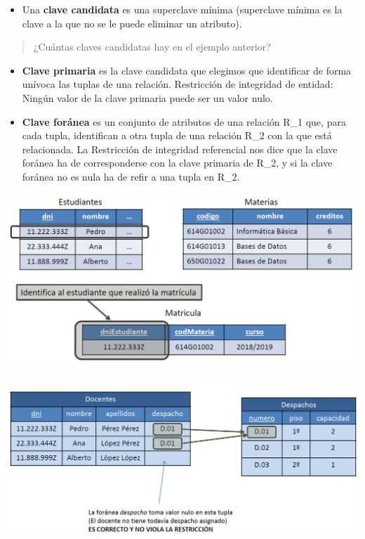 \documentclass[]{book}
\providecommand{\tightlist}{%
  \setlength{\itemsep}{0pt}\setlength{\parskip}{0pt}}
\begin{document}
\begin{itemize}
\tightlist
\item
  Una \textbf{clave candidata} es una superclave mínima (superclave mínima es la clave a la que no se le puede eliminar un atributo).
\end{itemize}

\begin{quote}
¿Cuántas claves candidatas hay en el ejemplo anterior?
\end{quote}

\begin{itemize}
\item
  \textbf{Clave primaria} es la clave candidata que elegimos que identificar de forma unívoca las tuplas de una relación. Restricción de integridad de entidad: Ningún valor de la clave primaria puede ser un valor nulo.
\item
  \textbf{Clave foránea} es un conjunto de atributos de una relación R\_1 que, para cada tupla, identifican a otra tupla de una relación R\_2 con la que está relacionada.
  La Restricción de integridad referencial nos dice que la clave foránea ha de corresponderse con la clave primaria de R\_2, y si la clave foránea no es nula ha de refir a una tupla en R\_2.
\end{itemize}

\includegraphics[width=6.25in,height=\textheight]{images/ClaveForanea.png}

\includegraphics[width=6.25in,height=\textheight]{images/IntegridadReferencial.png}
\end{document}
